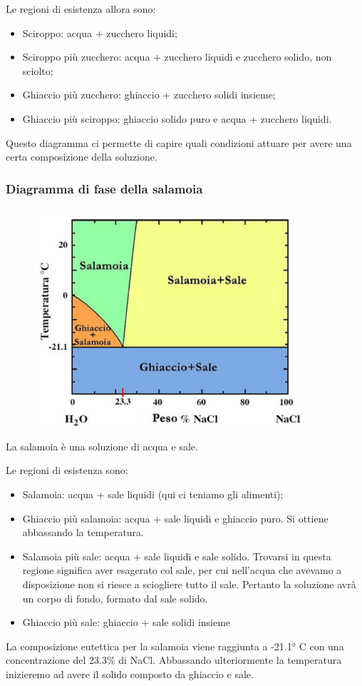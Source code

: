 Le regioni di esistenza allora sono:

\begin{itemize}
    \item Sciroppo: acqua + zucchero liquidi;
    \item Sciroppo più zucchero: acqua + zucchero liquidi e zucchero solido, non sciolto;
    \item Ghiaccio più zucchero: ghiaccio + zucchero solidi insieme;
    \item Ghiaccio più sciroppo: ghiaccio solido puro e acqua + zucchero liquidi.
\end{itemize}

Questo diagramma ci permette di capire quali condizioni attuare per avere una certa composizione della soluzione.
\subsubsection{Diagramma di fase della salamoia}

\begin{figure}[htp]
    \centering
    \includegraphics[width=10cm]{immagini/diagramma_di_stato_salamoia.png}
\end{figure}

La salamoia è una soluzione di acqua e sale.

Le regioni di esistenza sono:

\begin{itemize}
    \item Salamoia: acqua + sale liquidi (qui ci teniamo gli alimenti);
    \item Ghiaccio più salamoia: acqua + sale liquidi e ghiaccio puro. Si ottiene abbassando la temperatura.
    \item Salamoia più sale: acqua + sale liquidi e sale solido. Trovarsi in questa regione significa aver esagerato col sale, per cui nell'acqua che avevamo a disposizione non si riesce a sciogliere tutto il sale. Pertanto la soluzione avrà un corpo di fondo, formato dal sale solido.
    \item Ghiaccio più sale: ghiaccio + sale solidi insieme
\end{itemize}

La composizione eutettica per la salamoia viene raggiunta a -21.1° C con una concentrazione del 23.3\% di NaCl. Abbassando ulteriormente la temperatura inizieremo ad avere il solido composto da ghiaccio e sale.